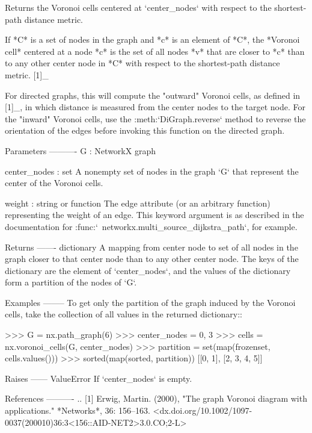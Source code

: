 \begin{DoxyVerb}Returns the Voronoi cells centered at `center_nodes` with respect
to the shortest-path distance metric.

If *C* is a set of nodes in the graph and *c* is an element of *C*,
the *Voronoi cell* centered at a node *c* is the set of all nodes
*v* that are closer to *c* than to any other center node in *C* with
respect to the shortest-path distance metric. [1]_

For directed graphs, this will compute the "outward" Voronoi cells,
as defined in [1]_, in which distance is measured from the center
nodes to the target node. For the "inward" Voronoi cells, use the
:meth:`DiGraph.reverse` method to reverse the orientation of the
edges before invoking this function on the directed graph.

Parameters
----------
G : NetworkX graph

center_nodes : set
    A nonempty set of nodes in the graph `G` that represent the
    center of the Voronoi cells.

weight : string or function
    The edge attribute (or an arbitrary function) representing the
    weight of an edge. This keyword argument is as described in the
    documentation for :func:`~networkx.multi_source_dijkstra_path`,
    for example.

Returns
-------
dictionary
    A mapping from center node to set of all nodes in the graph
    closer to that center node than to any other center node. The
    keys of the dictionary are the element of `center_nodes`, and
    the values of the dictionary form a partition of the nodes of
    `G`.

Examples
--------
To get only the partition of the graph induced by the Voronoi cells,
take the collection of all values in the returned dictionary::

    >>> G = nx.path_graph(6)
    >>> center_nodes = {0, 3}
    >>> cells = nx.voronoi_cells(G, center_nodes)
    >>> partition = set(map(frozenset, cells.values()))
    >>> sorted(map(sorted, partition))
    [[0, 1], [2, 3, 4, 5]]

Raises
------
ValueError
    If `center_nodes` is empty.

References
----------
.. [1] Erwig, Martin. (2000),
       "The graph Voronoi diagram with applications."
       *Networks*, 36: 156--163.
       <dx.doi.org/10.1002/1097-0037(200010)36:3<156::AID-NET2>3.0.CO;2-L>\end{DoxyVerb}
 